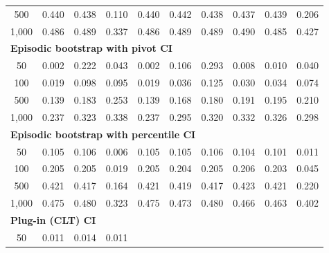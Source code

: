 \documentclass{article}
\numberwithin{equation}{section}
\begin{document}
\begin{table}[ht]
\begin{tabular}{c|ccc|cccccc}
500
& \cellcolor{covheat!70!white}0.440 & \cellcolor{covheat!69!white}0.438 & 0.110
& \cellcolor{covheat!70!white}0.440 & \cellcolor{covheat!71!white}0.442 & \cellcolor{covheat!69!white}0.438 & \cellcolor{covheat!68!white}0.437 & \cellcolor{covheat!70!white}0.439 & 0.206 \\
1{,}000
& \cellcolor{covheat!93!white}0.486 & \cellcolor{covheat!94!white}0.489 & \cellcolor{covheat!19!white}0.337
& \cellcolor{covheat!93!white}0.486 & \cellcolor{covheat!94!white}0.489 & \cellcolor{covheat!94!white}0.489 & \cellcolor{covheat!95!white}0.490 & \cellcolor{covheat!92!white}0.485 & \cellcolor{covheat!64!white}0.427 \\
\hline
\multicolumn{10}{l}{\textbf{Episodic bootstrap with pivot CI}} \\ \hline
50
& 0.002 & 0.222 & 0.043
& 0.002 & 0.106 & 0.293 & 0.008 & 0.010 & 0.040 \\
100
& 0.019 & 0.098 & 0.095
& 0.019 & 0.036 & 0.125 & 0.030 & 0.034 & 0.074 \\
500
& 0.139 & 0.183 & 0.253
& 0.139 & 0.168 & 0.180 & 0.191 & 0.195 & 0.210 \\
1{,}000
& 0.237 & \cellcolor{covheat!12!white}0.323 & \cellcolor{covheat!19!white}0.338
& 0.237 & 0.295 & \cellcolor{covheat!10!white}0.320 & \cellcolor{covheat!16!white}0.332 & \cellcolor{covheat!13!white}0.326 & 0.298 \\
\hline
\multicolumn{10}{l}{\textbf{Episodic bootstrap with percentile CI}} \\ \hline
50
& 0.105 & 0.106 & 0.006
& 0.105 & 0.105 & 0.106 & 0.104 & 0.101 & 0.011 \\
100
& 0.205 & 0.205 & 0.019
& 0.205 & 0.204 & 0.205 & 0.206 & 0.203 & 0.045 \\
500
& \cellcolor{covheat!60!white}0.421 & \cellcolor{covheat!58!white}0.417 & 0.164
& \cellcolor{covheat!60!white}0.421 & \cellcolor{covheat!60!white}0.419 & \cellcolor{covheat!58!white}0.417 & \cellcolor{covheat!62!white}0.423 & \cellcolor{covheat!60!white}0.421 & 0.220 \\
1{,}000
& \cellcolor{covheat!87!white}0.475 & \cellcolor{covheat!90!white}0.480 & \cellcolor{covheat!12!white}0.323
& \cellcolor{covheat!87!white}0.475 & \cellcolor{covheat!86!white}0.473 & \cellcolor{covheat!90!white}0.480 & \cellcolor{covheat!83!white}0.466 & \cellcolor{covheat!82!white}0.463 & \cellcolor{covheat!51!white}0.402 \\
\hline
\multicolumn{10}{l}{\textbf{Plug-in (CLT) CI}} \\ \hline
50
& 0.011 & 0.014 & 0.011

\end{tabular}
\end{table}
\end{document}
